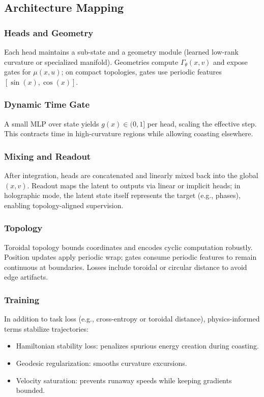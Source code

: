 \documentclass{article}
\numberwithin{equation}{section}
\begin{document}
\subsection{Architecture Mapping}
\subsubsection{Heads and Geometry}
Each head maintains a sub-state and a geometry module (learned low-rank curvature or specialized manifold). Geometries compute $\Gamma_\theta(x, v)$ and expose gates for $\mu(x,u)$; on compact topologies, gates use periodic features $[\sin(x), \cos(x)]$.

\subsubsection{Dynamic Time Gate}
A small MLP over state yields $g(x)\in(0,1]$ per head, scaling the effective step. This contracts time in high-curvature regions while allowing coasting elsewhere.

\subsubsection{Mixing and Readout}
After integration, heads are concatenated and linearly mixed back into the global $(x, v)$. Readout maps the latent to outputs via linear or implicit heads; in holographic mode, the latent state itself represents the target (e.g., phases), enabling topology-aligned supervision.

\subsubsection{Topology}
Toroidal topology bounds coordinates and encodes cyclic computation robustly. Position updates apply periodic wrap; gates consume periodic features to remain continuous at boundaries. Losses include toroidal or circular distance to avoid edge artifacts.

\subsubsection{Training}
In addition to task loss (e.g., cross-entropy or toroidal distance), physics-informed terms stabilize trajectories:
\begin{itemize}
\item Hamiltonian stability loss: penalizes spurious energy creation during coasting.
\item Geodesic regularization: smooths curvature excursions.
\item Velocity saturation: prevents runaway speeds while keeping gradients bounded.
\end{itemize}
\end{document}
